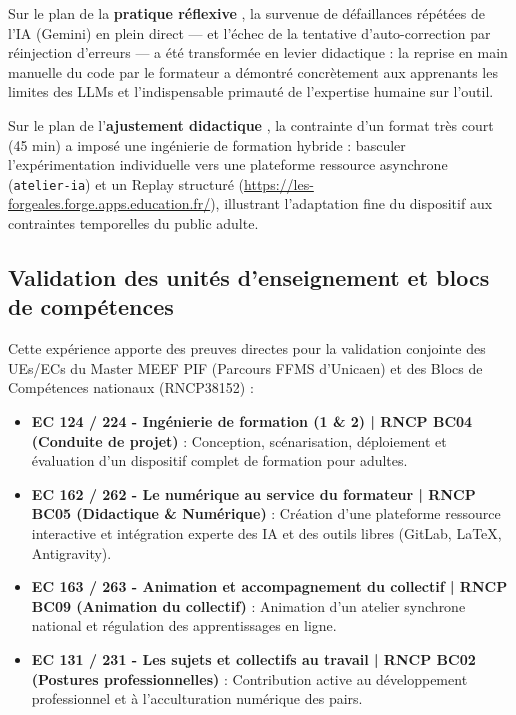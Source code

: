 Sur le plan de la \textbf{pratique réflexive} \parencite{schon_reflective_practitioner,perrenoud_pratique_reflexive}, la survenue de défaillances répétées de l'IA (Gemini) en plein direct — et l'échec de la tentative d'auto-correction par réinjection d'erreurs — a été transformée en levier didactique : la reprise en main manuelle du code par le formateur a démontré concrètement aux apprenants les limites des LLMs et l'indispensable primauté de l'expertise humaine sur l'outil.

Sur le plan de l'\textbf{ajustement didactique} \parencite{saillot_didactique_ajustement}, la contrainte d'un format très court (45 min) a imposé une ingénierie de formation hybride : basculer l'expérimentation individuelle vers une plateforme ressource asynchrone (\texttt{atelier-ia}) et un Replay structuré (\url{https://les-forgeales.forge.apps.education.fr/}), illustrant l'adaptation fine du dispositif aux contraintes temporelles du public adulte.

\subsection{Validation des unités d'enseignement et blocs de compétences}

Cette expérience apporte des preuves directes pour la validation conjointe des UEs/ECs du Master MEEF PIF (Parcours FFMS d'Unicaen) et des Blocs de Compétences nationaux (RNCP38152) :

\begin{itemize}[leftmargin=*]
    \item \textbf{EC 124 / 224 - Ingénierie de formation (1 \& 2) | RNCP BC04 (Conduite de projet)} : Conception, scénarisation, déploiement et évaluation d'un dispositif complet de formation pour adultes.
    \item \textbf{EC 162 / 262 - Le numérique au service du formateur | RNCP BC05 (Didactique \& Numérique)} : Création d'une plateforme ressource interactive et intégration experte des IA et des outils libres (GitLab, \LaTeX{}, Antigravity).
    \item \textbf{EC 163 / 263 - Animation et accompagnement du collectif | RNCP BC09 (Animation du collectif)} : Animation d'un atelier synchrone national et régulation des apprentissages en ligne.
    \item \textbf{EC 131 / 231 - Les sujets et collectifs au travail | RNCP BC02 (Postures professionnelles)} : Contribution active au développement professionnel et à l'acculturation numérique des pairs.
\end{itemize}
